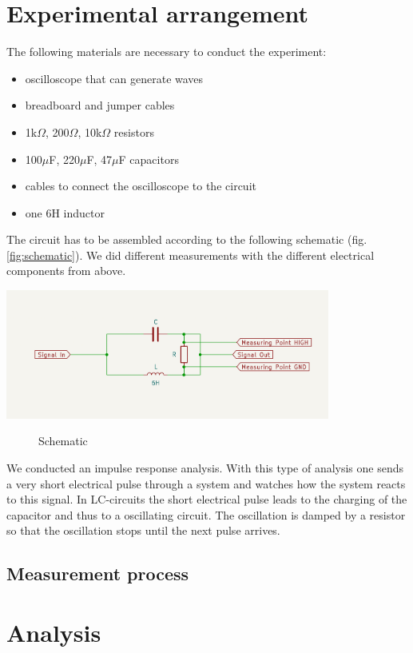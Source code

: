 \documentclass[a4paper,11pt]{article}
\begin{document}
\section{Experimental arrangement}

The following materials are necessary to conduct the experiment:
\begin{itemize}
    \item oscilloscope that can generate waves
    \item breadboard and jumper cables
    \item 1k$\Omega$, 200$\Omega$, 10k$\Omega$ resistors
    \item 100$\mu$F, 220$\mu$F, 47$\mu$F capacitors
    \item cables to connect the oscilloscope to the circuit
    \item one 6H inductor
\end{itemize}

The circuit has to be assembled according to the following schematic (fig. \ref{fig:schematic}). We did different measurements with the different electrical components from above. 

    \includegraphics[width=0.8\textwidth]{images/Screenshot 2023-04-05 at 21.19.41.png}
    \centering
\begin{figure}[!ht]
    \caption{Schematic}
\end{figure}

    \label{fig:schematic}
We conducted an impulse response analysis. With this type of analysis one sends a very short electrical pulse through a system and watches how the system reacts to this signal. In LC-circuits the short electrical pulse leads to the charging of the capacitor and thus to a oscillating circuit. The oscillation is damped by a resistor so that the oscillation stops until the next pulse arrives.
\subsection{Measurement process}

\section{Analysis}
\end{document}
